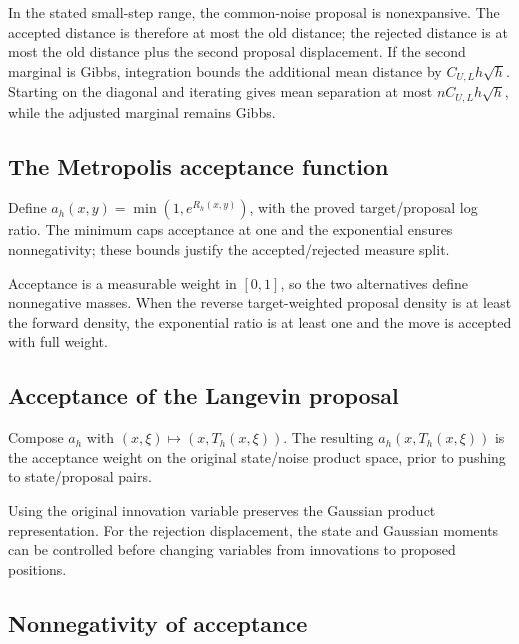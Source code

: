 \documentclass[11pt,a4paper]{article}
\begin{document}
In the stated small-step range, the common-noise proposal is nonexpansive. The accepted distance is therefore at most the old distance; the rejected distance is at most the old distance plus the second proposal displacement. If the second marginal is Gibbs, integration bounds the additional mean distance by \(C_{U,L}h\sqrt h\). Starting on the diagonal and iterating gives mean separation at most \(nC_{U,L}h\sqrt h\), while the adjusted marginal remains Gibbs.


\subsection{\texorpdfstring{The Metropolis acceptance function}{The Metropolis acceptance function}}


Define \(a_h(x,y)=\min(1,e^{R_h(x,y)})\), with the proved target/\allowbreak{}proposal log ratio. The minimum caps acceptance at one and the exponential ensures nonnegativity; these bounds justify the accepted/\allowbreak{}rejected measure split.



Acceptance is a measurable weight in \([0,1]\), so the two alternatives define nonnegative masses. When the reverse target-weighted proposal density is at least the forward density, the exponential ratio is at least one and the move is accepted with full weight.


\subsection{\texorpdfstring{Acceptance of the Langevin proposal}{Acceptance of the Langevin proposal}}


Compose \(a_h\) with \((x,\xi)\mapsto(x,T_h(x,\xi))\). The resulting \(a_h(x,T_h(x,\xi))\) is the acceptance weight on the original state/\allowbreak{}noise product space, prior to pushing to state/\allowbreak{}proposal pairs.



Using the original innovation variable preserves the Gaussian product representation. For the rejection displacement, the state and Gaussian moments can be controlled before changing variables from innovations to proposed positions.


\subsection{\texorpdfstring{Nonnegativity of acceptance}{Nonnegativity of acceptance}}
\end{document}
